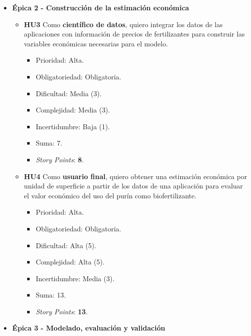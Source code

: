 \documentclass[
11pt, %
]{charter}
\begin{document}
\begin{itemize}
  \item \textbf{\'{E}pica 2 - Construcción de la estimación económica}
    \begin{itemize}

      \item \textbf{HU3} Como \textbf{científico de datos}, quiero integrar los datos de las aplicaciones con información de precios de fertilizantes para construir las variables económicas necesarias para el modelo.
        \begin{itemize}
          \item Prioridad: Alta.
          \item Obligatoriedad: Obligatoria.
          \item Dificultad: Media (3).
          \item Complejidad: Media (3).
          \item Incertidumbre: Baja (1).
          \item Suma: 7.
          \item \textit{Story Points}: \textbf{8}.
        \end{itemize}

      \item \textbf{HU4} Como \textbf{usuario final}, quiero obtener una estimación económica por unidad de superficie a partir de los datos de una aplicación para evaluar el valor económico del uso del purín como biofertilizante.
        \begin{itemize}
          \item Prioridad: Alta.
          \item Obligatoriedad: Obligatoria.
          \item Dificultad: Alta (5).
          \item Complejidad: Alta (5).
          \item Incertidumbre: Media (3).
          \item Suma: 13.
          \item \textit{Story Points}: \textbf{13}.
        \end{itemize}

    \end{itemize}


  \item \textbf{\'{E}pica 3 - Modelado, evaluación y validación}
    \begin{itemize}


\end{itemize}
\end{itemize}
\end{document}
